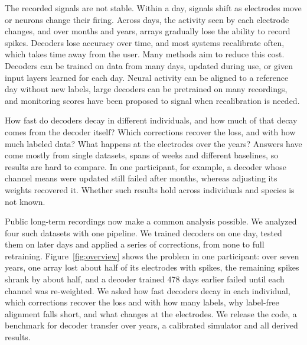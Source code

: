 \documentclass[pdflatex,sn-nature]{sn-jnl}
\begin{document}
The recorded signals are not stable. Within a day, signals shift as electrodes move or neurons change their
firing\cite{perge2013}. Across days, the activity seen by each electrode changes\cite{suner2005,chestek2011,
downey2018,bishop2014}, and over months and years, arrays gradually lose the ability to record spikes\cite{barrese2013,
sponheim2021,bjanes2025,hahn2026}. Decoders lose accuracy over time\cite{chestek2011,nuyujukian2014,
temmar2025,wilson2025}, and most systems recalibrate often, which takes time away from the user\cite{jarosiewicz2013,
jarosiewicz2015,brandman2018}. Many methods aim to reduce this cost. Decoders can be trained on data from many
days\cite{sussillo2016,natraj2025}, updated during use\cite{jarosiewicz2015,orsborn2012,dangi2013,wilson2025}, or given input
layers learned for each day\cite{willett2021,fan2023}. Neural activity can be aligned to a reference day without new
labels\cite{degenhart2020,gallego2020,farshchian2019,ma2023,karpowicz2025,jude2022,wang2023erdiff}, large decoders
can be pretrained on many recordings\cite{ye2023ndt2,azabou2023poyo,ryoo2025possm,ye2025ndt3}, and monitoring scores
have been proposed to
signal when recalibration is needed\cite{pun2024}.

How fast do decoders decay in different individuals, and how much of that decay comes from the decoder itself? Which
corrections recover the loss, and with how much labeled data? What happens at the electrodes over the years? Answers
have come mostly from single datasets, spans of weeks and different baselines\cite{karpowicz2024falcon}, so results are
hard to compare. In one participant, for example, a decoder whose channel means were updated still failed after months,
whereas adjusting its weights recovered it\cite{wilson2025}. Whether such results hold across individuals and species
is not known.

Public long-term recordings now make a common analysis possible\cite{temmar2025,gallego2020,perich2018,hahn2026,pun2024}.
We analyzed four such datasets with one pipeline. We trained decoders on one day, tested them on later days and applied
a series of corrections, from none to full retraining. Figure~\ref{fig:overview} shows the problem in one participant:
over seven years, one array lost about half of its electrodes with spikes, the remaining spikes shrank by about half,
and a decoder trained 478 days earlier failed until each channel was re-weighted. We asked how fast decoders decay in
each individual, which corrections recover the loss and with how many labels, why label-free alignment falls short, and
what changes at the electrodes. We release the code, a benchmark for decoder transfer over years, a calibrated
simulator and all derived results.
\end{document}
